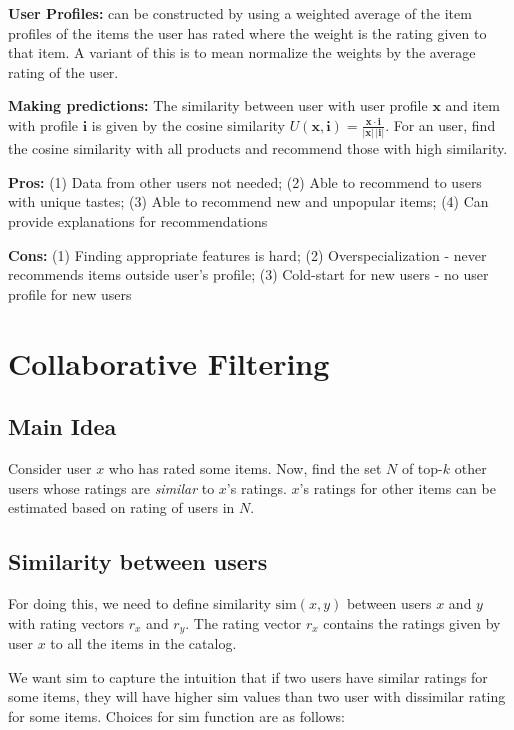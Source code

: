\documentclass{article}
\newcommand{\Sim}{\text{sim}}
\begin{document}
\textbf{User Profiles:} can be constructed by using a weighted average of the item profiles of the items the user has rated where the weight is the rating given to that item. A variant of this is to mean normalize the weights by the average rating of the user.

\textbf{Making predictions:} 
The similarity between user with user profile $\mathbf{x}$ and item with profile $\mathbf{i}$ is given by the cosine similarity $U(\mathbf{x},\mathbf{i}) = \frac{\mathbf{x}\cdot\mathbf{i}}{|\mathbf{x}|\,|\mathbf{i}|}$. For an user, find the cosine similarity with all products and recommend those with high similarity.

\textbf{Pros:} (1) Data from other users not needed; (2) Able to recommend to users with unique tastes; (3) Able to recommend new and unpopular items; (4) Can provide explanations for recommendations

\textbf{Cons:} (1) Finding appropriate features is hard; (2) Overspecialization - never recommends items outside user's profile; (3) Cold-start for new users - no user profile for new users

\section{Collaborative Filtering}
\subsection{Main Idea} 

Consider user $x$ who has rated some items. Now, find the set $N$ of top-$k$ other users whose ratings are \textit{similar} to $x$'s ratings. $x$'s ratings for other items can be estimated based on rating of users in $N$.

\subsection{Similarity between users}

For doing this, we need to define similarity $\Sim(x, y)$ between users $x$ and $y$ with rating vectors $r_x$ and $r_y$. The rating vector $r_x$ contains the ratings given by user $x$ to all the items in the catalog.

We want $\Sim$ to capture the intuition that if two users have similar ratings for some items, they will have higher $\Sim$ values than two user with dissimilar rating for some items. Choices for $\Sim$ function are as follows:
\end{document}
